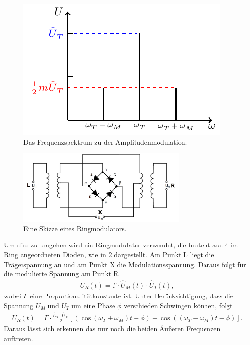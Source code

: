 \begin{figure}
	\centering
	\includegraphics[width =\textwidth/2]{../Grafiken/tikz/tikz-Frequenzspektrum.pdf}
	\caption{Das Frequenzspektrum zu der Amplitudenmodulation.\label{fig:Frequenzspektrum} }
\end{figure}
\newpage
\begin{figure}
	\centering
	\includegraphics[width = 0.75\textwidth]{../Grafiken/Ringmodulator.pdf}
	\caption{Eine Skizze eines Ringmodulators.\cite{V59}\label{fig:Ringmodulator}}
\end{figure}
Um dies zu umgehen wird ein Ringmodulator verwendet, die besteht aus 4 im Ring angeordneten Dioden, wie in \cref{fig:Ringmodulator} dargestellt.
Am Punkt L liegt die Trägerspannung an und am Punkt X die Modulationsspannung.
Daraus folgt für die modulierte Spannung am Punkt R
\begin{align}
	U_R(t)=\Gamma\cdot \hat U_M(t) \cdot\hat U_T(t),
\end{align}
wobei $\Gamma$ eine Proportionalitätkonstante ist. Unter Berücksichtigung, dass die Spannung $U_M$ und $U_T$ um eine Phase $\phi$ verschieden Schwingen können, folgt
\begin{align}
	U_R(t)=\Gamma\cdot \frac{\hat U_T\cdot\hat U_M}{2}\left[ \left(\cos\left(\omega_T+\omega_M\right)t+\phi\right) +\cos\left(\left(\omega_T-\omega_M\right)t-\phi\right) \right].
\end{align}
Daraus lässt sich erkennen das nur noch die beiden Äußeren Frequenzen auftreten.

